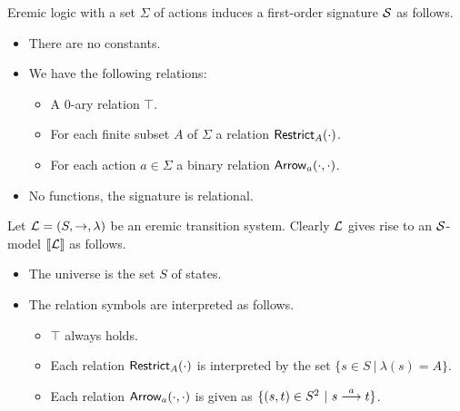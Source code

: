 \begin{definition} 
Eremic logic with a set $\Sigma$ of actions induces a first-order
signature $\mathcal{S}$ as follows.

\begin{itemize}

\item There are no constants.

\item We have the following relations:

  \begin{itemize}

    \item A 0-ary relation $\top$.
    \item For each finite subset $A$ of $\Sigma$ a relation $\mathsf{Restrict}_{A}(\cdot)$.
    \item For each action $a \in \Sigma$ a binary relation $\mathsf{Arrow}_{a}(\cdot, \cdot)$.

  \end{itemize}

\item No functions, the signature is relational.

\end{itemize}

\end{definition}

\begin{definition}
Let $\mathcal{L} = (S, \rightarrow, \lambda)$ be an eremic transition
system. Clearly $\mathcal{L}$ gives rise to an $\mathcal{S}$-model $\lbrack\!\lbrack \mathcal{L} \rbrack\!\rbrack$ as
follows.
\begin{itemize}

\item The universe is the set $S$ of states.

\item The relation symbols are interpreted as follows.

  \begin{itemize}

    \item $\top$ always holds.

    \item Each relation $\mathsf{Restrict}_{A}(\cdot)$ is interpreted by the
      set $\{s \in S\ |\ \lambda (s) = A\}$.

    \item Each relation $\mathsf{Arrow}_{a}(\cdot, \cdot)$ is given as $\{( s,
      t )\in S^2\ |\ s \stackrel{a}{\longrightarrow} t\}$.

  \end{itemize}
\end{itemize}

\end{definition}

